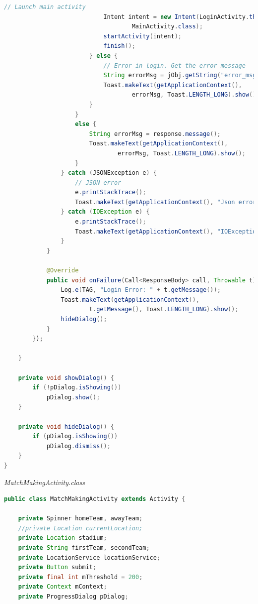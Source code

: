\documentclass{article}
\begin{document}
\begin{landscape}
\begin{lstlisting}[language=Java,basicstyle=\tiny]
                            // Launch main activity
                            Intent intent = new Intent(LoginActivity.this,
                                    MainActivity.class);
                            startActivity(intent);
                            finish();
                        } else {
                            // Error in login. Get the error message
                            String errorMsg = jObj.getString("error_msg");
                            Toast.makeText(getApplicationContext(),
                                    errorMsg, Toast.LENGTH_LONG).show();
                        }
                    }
                    else {
                        String errorMsg = response.message();
                        Toast.makeText(getApplicationContext(),
                                errorMsg, Toast.LENGTH_LONG).show();
                    }
                } catch (JSONException e) {
                    // JSON error
                    e.printStackTrace();
                    Toast.makeText(getApplicationContext(), "Json error: " + e.getMessage(), Toast.LENGTH_LONG).show();
                } catch (IOException e) {
                    e.printStackTrace();
                    Toast.makeText(getApplicationContext(), "IOException: " + e.getMessage(), Toast.LENGTH_LONG).show();
                }
            }

            @Override
            public void onFailure(Call<ResponseBody> call, Throwable t) {
                Log.e(TAG, "Login Error: " + t.getMessage());
                Toast.makeText(getApplicationContext(),
                        t.getMessage(), Toast.LENGTH_LONG).show();
                hideDialog();
            }
        });

    }

    private void showDialog() {
        if (!pDialog.isShowing())
            pDialog.show();
    }

    private void hideDialog() {
        if (pDialog.isShowing())
            pDialog.dismiss();
    }
}
\end{lstlisting}
{\large \textit{MatchMakingActivity.class}}
\begin{lstlisting}[language=Java,basicstyle=\tiny]
public class MatchMakingActivity extends Activity {

    private Spinner homeTeam, awayTeam;
    //private Location currentLocation;
    private Location stadium;
    private String firstTeam, secondTeam;
    private LocationService locationService;
    private Button submit;
    private final int mThreshold = 200;
    private Context mContext;
    private ProgressDialog pDialog;


\end{lstlisting}
\end{landscape}
\end{document}
